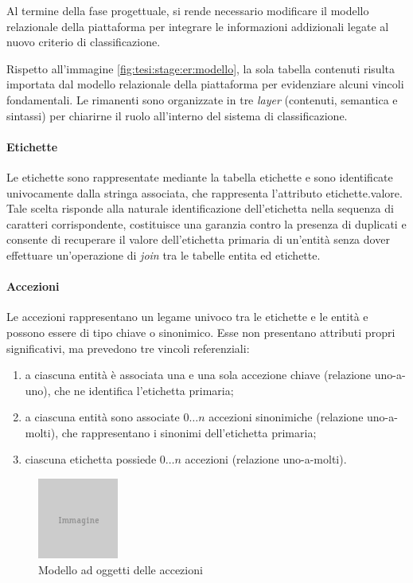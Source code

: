 Al termine della fase progettuale, si rende necessario modificare il modello relazionale della piattaforma per integrare le informazioni addizionali legate al nuovo criterio di classificazione.

Rispetto all'immagine \ref{fig:tesi:stage:er:modello}, la sola tabella \textsf{contenuti} risulta importata dal modello relazionale della piattaforma per evidenziare alcuni vincoli fondamentali. Le rimanenti sono organizzate in tre \textit{layer} (\textsf{contenuti}, \textsf{semantica} e \textsf{sintassi}) per chiarirne il ruolo all'interno del sistema di classificazione.

\paragraph{Etichette}
Le etichette sono rappresentate mediante la tabella \textsf{etichette} e sono identificate univocamente dalla stringa associata, che rappresenta l'attributo \textsf{etichette.valore}. Tale scelta risponde alla naturale identificazione dell'etichetta nella sequenza di caratteri corrispondente, costituisce una garanzia contro la presenza di duplicati e consente di recuperare il valore dell'etichetta primaria di un'entità senza dover effettuare un'operazione di \textit{join} tra le tabelle \textsf{entita} ed \textsf{etichette}.

\paragraph{Accezioni}
Le accezioni rappresentano un legame univoco tra le etichette e le entità e possono essere di tipo chiave o sinonimico. Esse non presentano attributi propri significativi, ma prevedono tre vincoli referenziali:
\begin{enumerate}
\item a ciascuna entità è associata una e una sola accezione chiave (relazione uno-a-uno), che ne identifica l'etichetta primaria;
\item a ciascuna entità sono associate $0\ldots n$ accezioni sinonimiche (relazione uno-a-molti), che rappresentano i sinonimi dell'etichetta primaria;
\item ciascuna etichetta possiede $0\ldots n$ accezioni (relazione uno-a-molti).
\end{enumerate}

\begin{figure}[ht]
	\begin{center}
		\includegraphics{img/placeholder.png}
		\caption{Modello ad oggetti delle accezioni}
		\label{fig:tesi:stage:er:accezioni}
	\end{center}
\end{figure}

